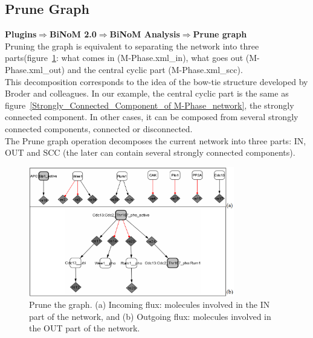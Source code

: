 \subsection{Prune Graph}
\textbf{Plugins$\Rightarrow$BiNoM 2.0$\Rightarrow$BiNoM Analysis$\Rightarrow$Prune graph}\\
Pruning the graph is equivalent to separating the network into three parts(figure~\ref{Prune_the_graph}: what comes in (M-Phase.xml\_in), what goes out (M-Phase.xml\_out) and the central cyclic part (M-Phase.xml\_scc).
\\This decomposition corresponds to the idea of the bow-tie structure developed by Broder and colleagues\cite{broder2000graph}. In our example, the central cyclic part is the same as figure~\ref{Strongly_Connected_Component_of M-Phase_network}, the strongly connected component. In other cases, it can be composed from several strongly connected components, connected or disconnected.\\
The Prune graph operation decomposes the current network into three parts: IN, OUT and SCC (the later can contain several strongly connected components).
\begin{figure}
\centering
\includegraphics[width=0.8\textwidth]{graphics/Prune_the_graph}
\caption{Prune the graph. (a) Incoming flux: molecules involved in the IN part of the network, and (b) Outgoing flux: molecules involved in the OUT part of the network.}
\label{Prune_the_graph}
\end{figure}

